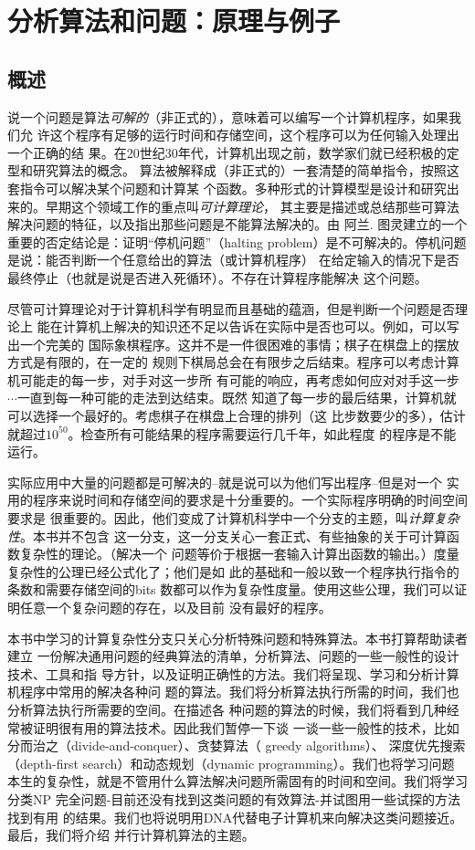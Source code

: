 
\chapter{分析算法和问题：原理与例子}\label{Sec:Chapter:FirstChap}

\section{概述}
说一个问题是算法\emph{可解的}（非正式的），意味着可以编写一个计算机程序，如果我们允
许这个程序有足够的运行时间和存储空间，这个程序可以为任何输入处理出一个正确的结
果。在20世纪30年代，计算机出现之前，数学家们就已经积极的定型和研究算法的概念。
算法被解释成（非正式的）一套清楚的简单指令，按照这套指令可以解决某个问题和计算某
个函数。多种形式的计算模型是设计和研究出来的。早期这个领域工作的重点叫\emph{可计算理论}，
其主要是描述或总结那些可算法解决问题的特征，以及指出那些问题是不能算法解决的。由
阿兰. 图灵建立的一个重要的否定结论是：证明“停机问题”（halting
problem）是不可解决的。停机问题是说：能否判断一个任意给出的算法（或计算机程序）
在给定输入的情况下是否最终停止（也就是说是否进入死循环）。不存在计算程序能解决
这个问题。


尽管可计算理论对于计算机科学有明显而且基础的蕴涵，但是判断一个问题是否理论上
能在计算机上解决的知识还不足以告诉在实际中是否也可以。例如，可以写出一个完美的
国际象棋程序。这并不是一件很困难的事情；棋子在棋盘上的摆放方式是有限的，在一定的
规则下棋局总会在有限步之后结束。程序可以考虑计算机可能走的每一步，对手对这一步所
有可能的响应，再考虑如何应对对手这一步$\cdots$一直到每一种可能的走法到达结束。既然
知道了每一步的最后结果，计算机就可以选择一个最好的。考虑棋子在棋盘上合理的排列（这
比步数要少的多），估计就超过$10^{50}$。检查所有可能结果的程序需要运行几千年，如此程度
的程序是不能运行。

实际应用中大量的问题都是可解决的--就是说可以为他们写出程序--但是对一个
实用的程序来说时间和存储空间的要求是十分重要的。一个实际程序明确的时间空间要求是
很重要的。因此，他们变成了计算机科学中一个分支的主题，叫\emph{计算复杂性}。本书并不包含
这一分支，这一分支关心一套正式、有些抽象的关于可计算函数复杂性的理论。（解决一个
问题等价于根据一套输入计算出函数的输出。）度量复杂性的公理已经公式化了；他们是如
此的基础和一般以致一个程序执行指令的条数和需要存储空间的bits
数都可以作为复杂性度量。使用这些公理，我们可以证明任意一个复杂问题的存在，以及目前
没有最好的程序。

本书中学习的计算复杂性分支只关心分析特殊问题和特殊算法。本书打算帮助读者建立
一份解决通用问题的经典算法的清单，分析算法、问题的一些一般性的设计技术、工具和指
导方针，以及证明正确性的方法。我们将呈现、学习和分析计算机程序中常用的解决各种问
题的算法。我们将分析算法执行所需的时间，我们也分析算法执行所需要的空间。在描述各
种问题的算法的时候，我们将看到几种经常被证明很有用的算法技术。因此我们暂停一下谈
一谈一些一般性的技术，比如分而治之（divide-and-conquer）、贪婪算法（
greedy algorithms）、 深度优先搜索（depth-first
search）和动态规划（dynamic programming）。我们也将学习问题
本生的复杂性，就是不管用什么算法解决问题所需固有的时间和空间。我们将学习分类NP
完全问题-目前还没有找到这类问题的有效算法-并试图用一些试探的方法找到有用
的结果。我们也将说明用DNA代替电子计算机来向解决这类问题接近。最后，我们将介绍
并行计算机算法的主题。

